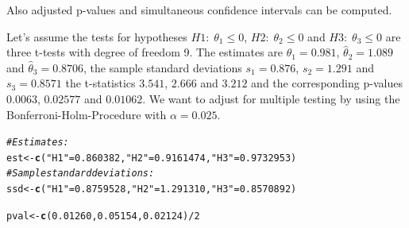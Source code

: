 \documentclass[a4paper, 10pt]{article}\usepackage[]{graphicx}\usepackage[]{color}
\makeatletter
\newcommand{\hlnum}[1]{\textcolor[rgb]{0.686,0.059,0.569}{#1}}%
\newcommand{\hlstr}[1]{\textcolor[rgb]{0.192,0.494,0.8}{#1}}%
\newcommand{\hlcom}[1]{\textcolor[rgb]{0.678,0.584,0.686}{\textit{#1}}}%
\newcommand{\hlopt}[1]{\textcolor[rgb]{0,0,0}{#1}}%
\newcommand{\hlstd}[1]{\textcolor[rgb]{0.345,0.345,0.345}{#1}}%
\newcommand{\hlkwb}[1]{\textcolor[rgb]{0.69,0.353,0.396}{#1}}%
\newcommand{\hlkwd}[1]{\textcolor[rgb]{0.737,0.353,0.396}{\textbf{#1}}}%
\newenvironment{kframe}{%
 \def\at@end@of@kframe{}%
 \ifinner\ifhmode%
  \def\at@end@of@kframe{\end{minipage}}%
  \begin{minipage}{\columnwidth}%
 \fi\fi%
 \def\FrameCommand##1{\hskip\@totalleftmargin \hskip-\fboxsep
 \colorbox{shadecolor}{##1}\hskip-\fboxsep
     \hskip-\linewidth \hskip-\@totalleftmargin \hskip\columnwidth}%
 \MakeFramed {\advance\hsize-\width
   \@totalleftmargin\z@ \linewidth\hsize
   \@setminipage}}%
 {\par\unskip\endMakeFramed%
 \at@end@of@kframe}
\newenvironment{knitrout}{}{} %
\numberwithin{equation}{section}
\theoremstyle{definition}
\theoremstyle{plain}
\makeatother
\begin{document}
Also adjusted p-values and simultaneous confidence intervals can be computed.




Let's assume the tests for hypotheses $H1:\;\theta_1\leq0$,
$H2:\;\theta_2\leq0$ and $H3:\;\theta_3\leq0$ are three t-tests with degree
of freedom 9.  The estimates are
$\hat\theta_1=0.981$,
$\hat\theta_2=1.089$ and
$\hat\theta_3=0.8706$, the sample standard deviations
$s_1=0.876$,
$s_2=1.291$ and
$s_3=0.8571$ the t-statistics
$3.541$, $2.666$ and
$3.212$ and the corresponding p-values $0.0063$, 
$0.02577$ and
$0.01062$.  We want to adjust for multiple testing
by using the Bonferroni-Holm-Procedure with $\alpha=0.025$.

\begin{knitrout}\footnotesize
{}\color{fgcolor}\begin{kframe}
\begin{alltt}
\hlcom{# Estimates:}
\hlstd{est} \hlkwb{<-} \hlkwd{c}\hlstd{(}\hlstr{"H1"}\hlstd{=}\hlnum{0.860382}\hlstd{,} \hlstr{"H2"}\hlstd{=}\hlnum{0.9161474}\hlstd{,} \hlstr{"H3"}\hlstd{=}\hlnum{0.9732953}\hlstd{)}
\hlcom{# Sample standard deviations:}
\hlstd{ssd} \hlkwb{<-} \hlkwd{c}\hlstd{(}\hlstr{"H1"}\hlstd{=}\hlnum{0.8759528}\hlstd{,} \hlstr{"H2"}\hlstd{=}\hlnum{1.291310}\hlstd{,} \hlstr{"H3"}\hlstd{=}\hlnum{0.8570892}\hlstd{)}

\hlstd{pval} \hlkwb{<-} \hlkwd{c}\hlstd{(}\hlnum{0.01260}\hlstd{,} \hlnum{0.05154}\hlstd{,} \hlnum{0.02124}\hlstd{)}\hlopt{/}\hlnum{2}


\end{alltt}
\end{kframe}
\end{knitrout}
\end{document}
